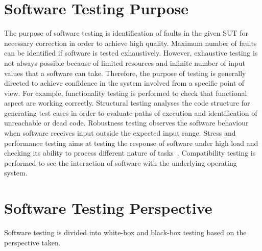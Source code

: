 \section{Software Testing Purpose}
The purpose of software testing is identification of faults in the given SUT for necessary correction in order to achieve high quality. Maximum number of faults can be identified if software is tested exhaustively. However, exhaustive testing is not always possible because of limited resources and infinite number of input values that a software can take. Therefore, the purpose of testing is generally directed to achieve confidence in the system involved from a specific point of view. For example, functionality testing is performed to check that functional aspect are working correctly. Structural testing analyses the code structure for generating test cases in order to evaluate paths of execution and identification of unreachable or dead code. Robustness testing observes the software behaviour when software receives input outside the expected input range. Stress and performance testing aims at testing the response of software under high load and checking its ability to process different nature of tasks~\cite{cohen2005robustness}. Compatibility testing is performed to see the interaction of software with the underlying operating system.

\section{Software Testing Perspective}
Software testing is divided into white-box and black-box testing based on the perspective taken.


